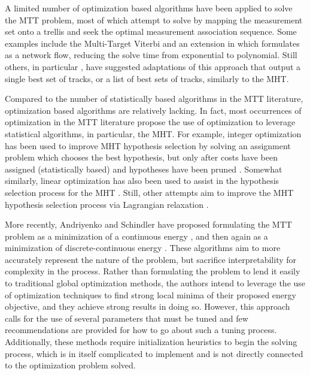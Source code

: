 A limited number of optimization based algorithms have been applied to solve the MTT problem, most of which attempt to solve by mapping the measurement set onto a trellis and seek the optimal measurement association sequence. Some examples include the Multi-Target Viterbi \cite{Viterbi-1} and an extension in \cite{Viterbi-2} which formulates \cite{Viterbi-1} as a network flow, reducing the solve time from exponential to polynomial. Still others, in particular \cite{Viterbi-3}, have suggested adaptations of this approach that output a single best set of tracks, or a list of best sets of tracks, similarly to the MHT.  

Compared to the number of statistically based algorithms in the MTT literature, optimization based algorithms are relatively lacking. In fact, most occurrences of optimization in the MTT literature propose the use of optimization to leverage statistical algorithms, in particular, the MHT. For example, integer optimization has been used to improve MHT hypothesis selection by solving an assignment problem which chooses the best hypothesis, but only after costs have been assigned (statistically based) and hypotheses have been pruned \cite{MHT-IP}. Somewhat similarly, linear optimization has also been used to assist in the hypothesis selection process for the MHT \cite{MHT-LP}. Still, other attempts aim to improve the MHT hypothesis selection process via Lagrangian relaxation \cite{Lagrangian}. 

More recently, Andriyenko and Schindler have proposed formulating the MTT problem as a minimization of a continuous energy \cite{Continuous_energy}, and then again as a minimization of discrete-continuous energy \cite{Discrete-Continuous_energy}. These algorithms aim to more accurately represent the nature of the problem, but sacrifice interpretability for complexity in the process. Rather than formulating the problem to lend it easily to traditional global optimization methods, the authors intend to leverage the use of optimization techniques to find strong local minima of their proposed energy objective, and they achieve strong results in doing so. However, this approach calls for the use of several parameters that must be tuned and few recommendations are provided for how to go about such a tuning process. Additionally, these methods require initialization heuristics to begin the solving process, which is in itself complicated to implement and is not directly connected to the optimization problem solved. 

